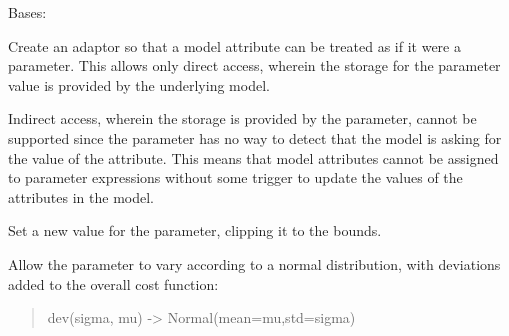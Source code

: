 \documentclass[letterpaper,10pt,english]{sphinxmanual}
\begin{document}
\begin{fulllineitems}
\label{api/mystic.parameter:refl1d.mystic.parameter.Reference}
Bases: {\hyperref[api/mystic.parameter:refl1d.mystic.parameter.Parameter]{}}

Create an adaptor so that a model attribute can be treated as if it
were a parameter.  This allows only direct access, wherein the
storage for the parameter value is provided by the underlying model.

Indirect access, wherein the storage is provided by the parameter, cannot
be supported since the parameter has no way to detect that the model
is asking for the value of the attribute.  This means that model
attributes cannot be assigned to parameter expressions without some
trigger to update the values of the attributes in the model.

\begin{fulllineitems}
\label{api/mystic.parameter:refl1d.mystic.parameter.Reference.clip_set}
Set a new value for the parameter, clipping it to the bounds.

\end{fulllineitems}


\begin{fulllineitems}
\label{api/mystic.parameter:refl1d.mystic.parameter.Reference.default}
\end{fulllineitems}


\begin{fulllineitems}
\label{api/mystic.parameter:refl1d.mystic.parameter.Reference.dev}
Allow the parameter to vary according to a normal distribution, with
deviations added to the overall cost function:
\begin{quote}

dev(sigma, mu) -\textgreater{} Normal(mean=mu,std=sigma)
\end{quote}


\end{fulllineitems}
\end{fulllineitems}
\end{document}
